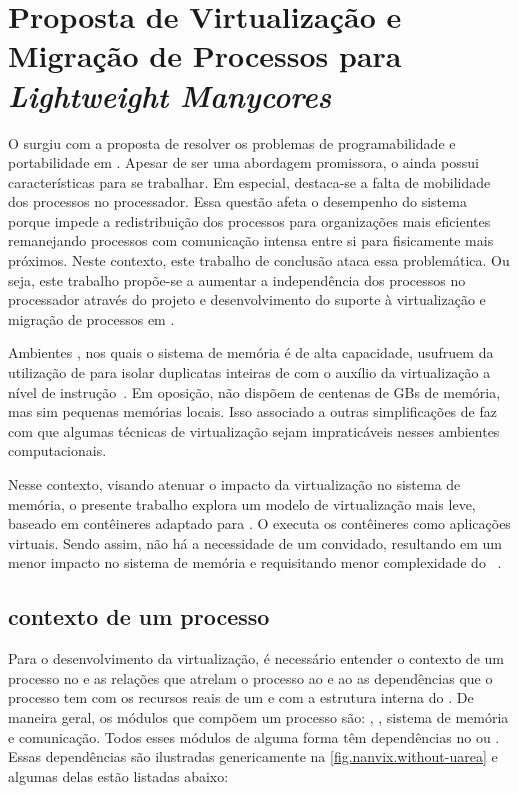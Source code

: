 \glsresetall
\chapter{Proposta de Virtualização e Migração de Processos para \textit{Lightweight Manycores}}
\label{chap.dev.virtualizacao}

O \nanvix surgiu com a proposta de resolver os problemas de programabilidade e portabilidade em \lws. Apesar de ser uma abordagem promissora, o \so ainda possui características para se trabalhar. Em especial, destaca-se a falta de mobilidade dos processos no processador. Essa questão afeta o desempenho do sistema porque impede a redistribuição dos processos para organizações mais eficientes \eg remanejando processos com comunicação intensa entre si para \clusters fisicamente mais próximos. Neste contexto, este trabalho de conclusão ataca essa problemática. Ou seja, este trabalho propõe-se a aumentar a independência dos processos no processador através do projeto e desenvolvimento do suporte à virtualização e migração de processos em \lws.

Ambientes \cloud, nos quais o sistema de memória é de alta capacidade, usufruem da utilização de \vms para isolar duplicatas inteiras de \oss com o auxílio da virtualização a nível de instrução~\cite{sharma2016containers}. Em oposição, \lws não dispõem de centenas de GBs de memória, mas sim pequenas memórias locais. Isso associado a outras simplificações de \hardware faz com que algumas técnicas de virtualização sejam impraticáveis nesses ambientes computacionais.


Nesse contexto, visando atenuar o impacto da virtualização no sistema de memória, o presente trabalho explora um modelo de virtualização mais leve, baseado em contêineres adaptado para \lws. O \so executa os contêineres como aplicações virtuais. Sendo assim, não há a necessidade de um \os convidado, resultando em um menor impacto no sistema de memória e requisitando menor complexidade do \hardware~\cite{thalheim2018cntr, sharma2016containers}.


\section{contexto de um processo}

Para o desenvolvimento da virtualização, é necessário entender o contexto de um processo no \nanvix e as relações que atrelam o processo ao \cluster e ao \so \ie as dependências que o processo tem com os recursos reais de um \cluster e com a estrutura interna do \so. De maneira geral, os módulos que compõem um processo são: \threads, \syscalls, sistema de memória e comunicação. Todos esses módulos de alguma forma têm dependências no  ou \cluster. Essas dependências são ilustradas genericamente na \autoref{fig.nanvix.without-uarea} e algumas delas estão listadas abaixo:

